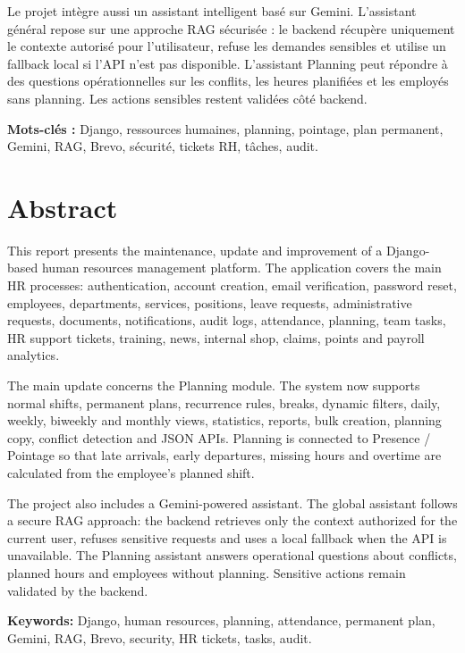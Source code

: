 \documentclass[12pt,a4paper]{report}
\begin{document}
Le projet intègre aussi un assistant intelligent basé sur Gemini. L'assistant général repose sur une approche RAG sécurisée : le backend récupère uniquement le contexte autorisé pour l'utilisateur, refuse les demandes sensibles et utilise un fallback local si l'API n'est pas disponible. L'assistant Planning peut répondre à des questions opérationnelles sur les conflits, les heures planifiées et les employés sans planning. Les actions sensibles restent validées côté backend.

\textbf{Mots-clés :} Django, ressources humaines, planning, pointage, plan permanent, Gemini, RAG, Brevo, sécurité, tickets RH, tâches, audit.
\newpage

\chapter*{Abstract}
This report presents the maintenance, update and improvement of a Django-based human resources management platform. The application covers the main HR processes: authentication, account creation, email verification, password reset, employees, departments, services, positions, leave requests, administrative requests, documents, notifications, audit logs, attendance, planning, team tasks, HR support tickets, training, news, internal shop, claims, points and payroll analytics.

The main update concerns the Planning module. The system now supports normal shifts, permanent plans, recurrence rules, breaks, dynamic filters, daily, weekly, biweekly and monthly views, statistics, reports, bulk creation, planning copy, conflict detection and JSON APIs. Planning is connected to Presence / Pointage so that late arrivals, early departures, missing hours and overtime are calculated from the employee's planned shift.

The project also includes a Gemini-powered assistant. The global assistant follows a secure RAG approach: the backend retrieves only the context authorized for the current user, refuses sensitive requests and uses a local fallback when the API is unavailable. The Planning assistant answers operational questions about conflicts, planned hours and employees without planning. Sensitive actions remain validated by the backend.

\textbf{Keywords:} Django, human resources, planning, attendance, permanent plan, Gemini, RAG, Brevo, security, HR tickets, tasks, audit.
\newpage

\listoffigures
{}
\newpage
\listoftables
{}
\newpage
\end{document}
